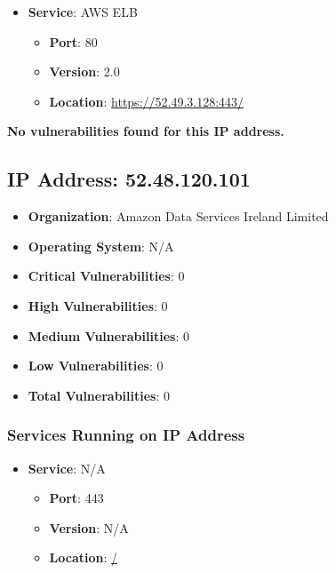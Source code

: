 \documentclass{article}
\begin{document}
\begin{itemize}
    
        \item \textbf{Service}: AWS ELB
        \begin{itemize}
            \item \textbf{Port}: 80
            \item \textbf{Version}:  2.0 
            \item \textbf{Location}: \href{ https://52.49.3.128:443/ }{ https://52.49.3.128:443/ }
        \end{itemize}
    
\end{itemize}


\textbf{No vulnerabilities found for this IP address.}




\clearpage



\subsection{IP Address: 52.48.120.101}

\begin{itemize}
    \item \textbf{Organization}: Amazon Data Services Ireland Limited
    \item \textbf{Operating System}:  N/A 
    \item \textbf{Critical Vulnerabilities}: 0
    \item \textbf{High Vulnerabilities}: 0
    \item \textbf{Medium Vulnerabilities}: 0
    \item \textbf{Low Vulnerabilities}: 0
    \item \textbf{Total Vulnerabilities}: 0
\end{itemize}

\subsubsection*{Services Running on IP Address}

\begin{itemize}
    
        \item \textbf{Service}: N/A
        \begin{itemize}
            \item \textbf{Port}: 443
            \item \textbf{Version}:  N/A 
            \item \textbf{Location}: \href{ / }{ / }
        \end{itemize}
    
\end{itemize}
\end{document}
